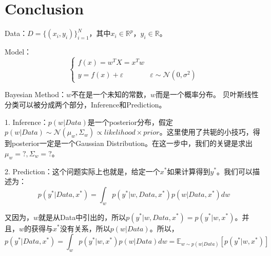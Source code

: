 \documentclass[a4paper]{article}
\begin{document}
\section{Conclusion}
Data：$D=\{(x_i,y_i)\}^{N}_{i=1}$，其中$x_i\in\mathbb{R}^{p}$，$y_i\in\mathbb{R}$。

Model：
\begin{equation}
\left\{
\begin{array}{ll}
      f(x)=w^TX = x^Tw & \\
      y = f(x) + \varepsilon & \varepsilon \sim \mathcal{N}(0,\sigma^2)
\end{array}
\right.    
\end{equation}

Bayesian Method：$w$不在是一个未知的常数，$w$而是一个概率分布。
贝叶斯线性分类可以被分成两个部分，Inference和Prediction。

1. Inference：$p(w|Data)$是一个posterior分布，假定$p(w|Data)\sim\mathcal{N}(\mu_w, \Sigma_w) \propto likelihood \times prior$。这里使用了共轭的小技巧，得到posterior一定是一个Gaussian Distribution。在这一步中，我们的关键是求出$\mu_w=?,\Sigma_w=?$。

2. Prediction：这个问题实际上也就是，给定一个$x^\ast$如果计算得到$y^\ast$。我们可以描述为：
\begin{equation}
    p(y^\ast|Data,x^\ast) = \int_w p(y^\ast|w,Data,x^\ast)p(w|Data,x^\ast) dw 
\end{equation}

又因为，$w$就是从Data中引出的，所以$p(y^\ast|w,Data,x^\ast)=p(y^\ast|w,x^\ast)$。并且，$w$的获得与$x^\ast$没有关系，所以$p(w|Data)$。所以，
\begin{equation}
    p(y^\ast|Data,x^\ast) = \int_w p(y^\ast|w,x^\ast)p(w|Data) dw = \mathbb{E}_{w\sim p(w|Data)}[p(y^\ast|w,x^\ast)] 
\end{equation}
\end{document}
